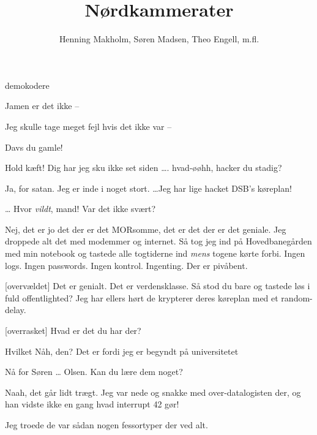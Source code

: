 \documentclass[danish]{article}
\title{Nørdkammerater}
\author{Henning Makholm, Søren Madsen, Theo Engell, m.fl.}
\begin{document}
\maketitle
\begin{sketch}
\begin{roles}
 demokodere
\end{roles}


 Jamen er det ikke --

 Jeg skulle tage meget fejl hvis det ikke var --

 Davs du gamle!

  Hold kæft! Dig har jeg
sku ikke set siden \ldots {}. hvad-øøhh, hacker du
stadig?

 Ja, for satan.  Jeg er inde i noget
stort. \ldots Jeg har lige hacket DSB's køreplan!

 \ldots {}
Hvor \emph{vildt}, mand! Var det ikke svært?

 Nej, det er jo det der er det MORsomme, det er det der
er det geniale. Jeg droppede alt det med modemmer og internet. Så tog jeg
ind på Hovedbanegården med min notebook og tastede alle togtiderne ind
\emph{mens} togene kørte forbi.  Ingen logs.  Ingen passwords.  Ingen kontrol.  
Ingenting.  Der er pivåbent.

[overvældet] Det er genialt. Det er verdensklasse.
 Så stod du bare og
tastede løs i fuld offentlighted? Jeg har ellers hørt de krypterer deres
køreplan med et random-delay.

[overrasket] Hvad er det du har der?

 Hvilket  Nåh, den? Det er fordi jeg
er begyndt på universitetet 

 Nå for Søren  \ldots
Olsen. Kan du lære dem noget?

 Naah, det går lidt trægt. Jeg var nede og snakke med
over-datalogisten der, og han vidste ikke en gang hvad interrupt 42 gør!

 Jeg troede de var sådan nogen fessortyper der ved alt.


\end{sketch}
\end{document}
